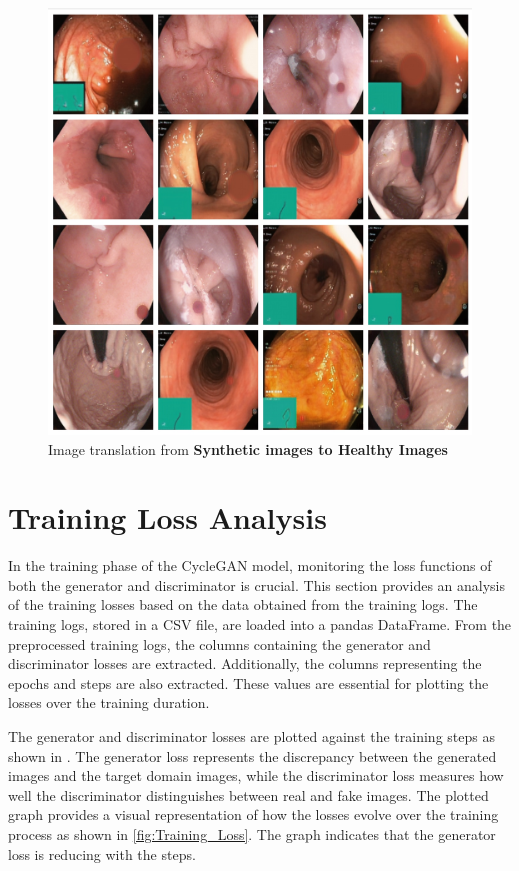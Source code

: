 \documentclass[UKenglish,12pt]{master-style}
\begin{document}
\begin{figure}[htbp]
    \centering
    \includegraphics[width=1\textwidth]{Images/Output_B_A.jpeg}
    \caption{Image translation from \textbf{Synthetic images to Healthy Images}}
    \label{fig:Output_B_A}
\end{figure}

\section{Training Loss Analysis}

In the training phase of the CycleGAN model, monitoring the loss functions of both the generator and discriminator is crucial. This section provides an analysis of the training losses based on the data obtained from the training logs. The training logs, stored in a CSV file, are loaded into a pandas DataFrame. From the preprocessed training logs, the columns containing the generator and discriminator losses are extracted. Additionally, the columns representing the epochs and steps are also extracted. These values are essential for plotting the losses over the training duration.

The generator and discriminator losses are plotted against the training steps as shown in . The generator loss represents the discrepancy between the generated images and the target domain images, while the discriminator loss measures how well the discriminator distinguishes between real and fake images. The plotted graph provides a visual representation of how the losses evolve over the training process as shown in \ref{fig:Training_Loss}. The graph indicates that the generator loss is reducing with the steps.
\end{document}

